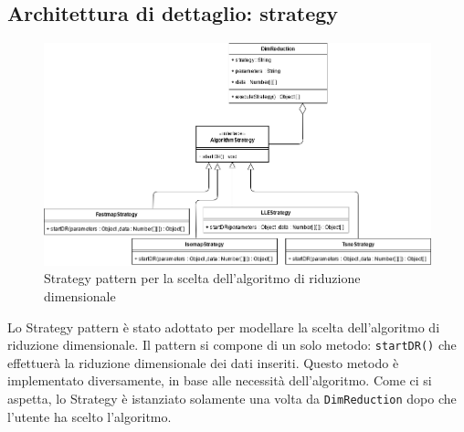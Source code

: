 \subsection{Architettura di dettaglio: strategy}
\begin{figure}[hb]
	\includegraphics[width=15.8cm]{Images/StrategyPattern}
	\centering
	\caption{Strategy pattern per la scelta dell'algoritmo di riduzione dimensionale}
\end{figure}
Lo Strategy pattern è stato adottato per modellare la scelta dell'algoritmo di riduzione dimensionale. Il pattern si compone di un solo metodo: \texttt{startDR()} che effettuerà la riduzione dimensionale dei dati inseriti. Questo metodo è implementato diversamente, in base alle necessità dell'algoritmo. Come ci si aspetta, lo Strategy è istanziato solamente una volta da \texttt{DimReduction} dopo che l'utente ha scelto l'algoritmo.